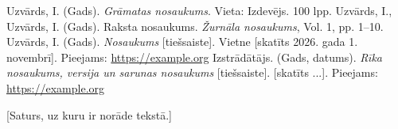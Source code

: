 \documentclass{zpd}
\begin{document}
\begin{avoti}
  \avots Uzvārds, I. (Gads). \textit{Grāmatas nosaukums}. Vieta: Izdevējs. 100 lpp.
  \avots Uzvārds, I., Uzvārds, I. (Gads). Raksta nosaukums. \textit{Žurnāla nosaukums}, Vol. 1, pp. 1--10.
  \avots Uzvārds, I. (Gads). \textit{Nosaukums} [tiešsaiste]. Vietne [skatīts 2026. gada 1. novembrī]. Pieejams: \url{https://example.org}
  \avots Izstrādātājs. (Gads, datums). \textit{Rīka nosaukums, versija un sarunas nosaukums} [tiešsaiste]. [skatīts ...]. Pieejams: \url{https://example.org}
\end{avoti}

[Saturs, uz kuru ir norāde tekstā.]
\end{document}
